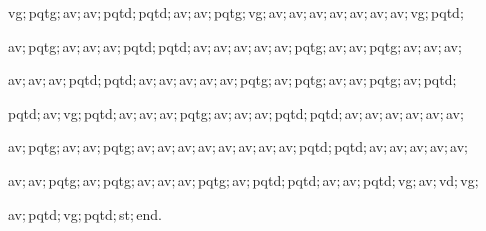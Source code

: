 {\vspace{\neglskip}\mbox{\blc  \idt  vg$;$pqtg$;$av$;$av$;$pqtd$;$pqtd$;$av$;$av$;$pqtg$;$vg$;$av$;$av$;$av$;$av$;$av$;$av$;$av$;$vg$;$pqtd$;$}\par 
\vspace{\neglskip}\mbox{\blc  \idt  av$;$pqtg$;$av$;$av$;$av$;$pqtd$;$pqtd$;$av$;$av$;$av$;$av$;$av$;$pqtg$;$av$;$av$;$pqtg$;$av$;$av$;$av$;$}\par 
\vspace{\neglskip}\mbox{\blc  \idt  av$;$av$;$av$;$pqtd$;$pqtd$;$av$;$av$;$av$;$av$;$av$;$pqtg$;$av$;$pqtg$;$av$;$av$;$pqtg$;$av$;$pqtd$;$}\par 
\vspace{\neglskip}\mbox{\blc  \idt  pqtd$;$av$;$vg$;$pqtd$;$av$;$av$;$av$;$pqtg$;$av$;$av$;$av$;$pqtd$;$pqtd$;$av$;$av$;$av$;$av$;$av$;$av$;$}\par 
\vspace{\neglskip}\mbox{\blc  \idt  av$;$pqtg$;$av$;$av$;$pqtg$;$av$;$av$;$av$;$av$;$av$;$av$;$av$;$av$;$pqtd$;$pqtd$;$av$;$av$;$av$;$av$;$av$;$}\par 
\vspace{\neglskip}\mbox{\blc  \idt  av$;$av$;$pqtg$;$av$;$pqtg$;$av$;$av$;$av$;$pqtg$;$av$;$pqtd$;$pqtd$;$av$;$av$;$pqtd$;$vg$;$av$;$vd$;$vg$;$}\par 
\vspace{\neglskip}\mbox{\blc  \idt  av$;$pqtd$;$vg$;$pqtd$;$st$;$\mcl end\idt $.$}\par 

\medskip }

